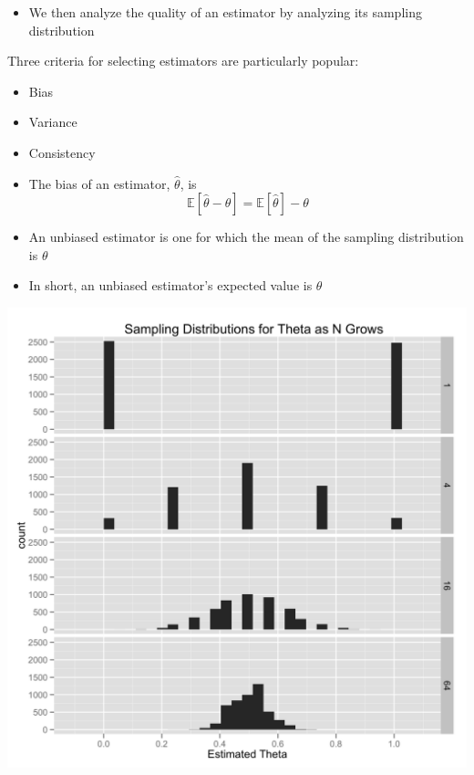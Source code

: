 \documentclass{beamer}
\begin{document}
\frame
{
  \begin{itemize}
    \item{We then analyze the quality of an estimator by analyzing its sampling distribution}
  \end{itemize}
}

\frame
{
 Three criteria for selecting estimators are particularly popular:
 \begin{itemize}
   \item{Bias}
   \item{Variance}
   \item{Consistency}
 \end{itemize}
}

\frame
{
  \begin{itemize}
    \item{The bias of an estimator, $\hat{\theta}$, is}
    \[
    \mathbb{E}[\hat{\theta} - \theta] = \mathbb{E}[\hat{\theta}] - \theta
    \]
    \item{An unbiased estimator is one for which the mean of the sampling distribution is $\theta$}
    \item{In short, an unbiased estimator's expected value is $\theta$}
  \end{itemize}
}

\frame
{
  \begin{center}
    \includegraphics[scale = 0.1]{sampling_distribution.png}
  \end{center}
}
\end{document}
